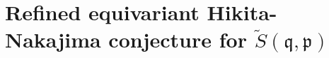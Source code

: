 \documentclass[12pt]{amsart}
\begin{document}











































\section{Refined equivariant Hikita-Nakajima conjecture for $\widetilde{S}(\mathfrak{q},\mathfrak{p})$}\label{Section_weak_HN_for_parab_lodowy_proof}  
\end{document}
